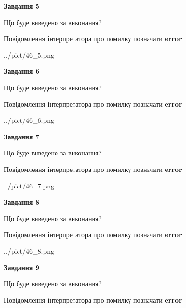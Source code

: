 \documentclass[11pt, ukrainian]{article}
\begin{document}
{\begin {large}
{\begin {center}\textbf{Завдання 5}\end {center}}\par
Що буде виведено за виконання? \par
Повідомлення інтерпретатора про помилку позначати \textbf{error}

\begin{center}
	{../pict/46_5.png}
\end{center}
\newpage

{\begin {center}\textbf{Завдання 6}\end {center}}\par
Що буде виведено за виконання? \par
Повідомлення інтерпретатора про помилку позначати \textbf{error}

\begin{center}
	{../pict/46_6.png}
\end{center}
\newpage

{\begin {center}\textbf{Завдання 7}\end {center}}\par
Що буде виведено за виконання? \par
Повідомлення інтерпретатора про помилку позначати \textbf{error}

\begin{center}
	{../pict/46_7.png}
\end{center}
\newpage

{\begin {center}\textbf{Завдання 8}\end {center}}\par
Що буде виведено за виконання? \par
Повідомлення інтерпретатора про помилку позначати \textbf{error}

\begin{center}
	{../pict/46_8.png}
\end{center}
\newpage

{\begin {center}\textbf{Завдання 9}\end {center}}\par
Що буде виведено за виконання? \par
Повідомлення інтерпретатора про помилку позначати \textbf{error}


\end{large}}
\end{document}
